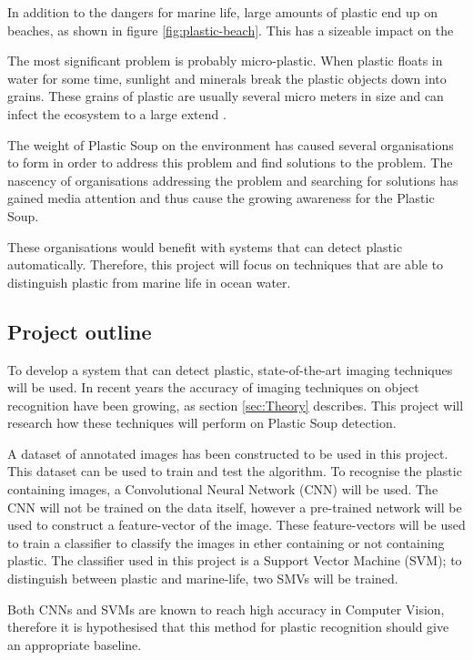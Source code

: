 In addition to the dangers for marine life, large amounts of plastic end up on beaches, as shown in figure \ref{fig:plastic-beach}.
This has a sizeable impact on the 

The most significant problem is probably micro-plastic.
When plastic floats in water for some time, sunlight and minerals break the plastic objects down into grains.
These grains of plastic are usually several micro meters in size and can infect the ecosystem to a large extend \citet{moore2011plastic}.

The weight of Plastic Soup on the environment has caused several organisations to form in order to address this problem and find solutions to the problem.
The nascency of organisations addressing the problem and searching for solutions has gained media attention and thus cause the growing awareness for the Plastic Soup.

These organisations would benefit with systems that can detect plastic automatically.
Therefore, this project will focus on techniques that are able to distinguish plastic from marine life in ocean water.

\subsection{Project outline}
\label{sec:Intro-Me}
To develop a system that can detect plastic, state-of-the-art imaging techniques will be used.
In recent years the accuracy of imaging techniques on object recognition have been growing, as section \ref{sec:Theory} describes.
This project will research how these techniques will perform on Plastic Soup detection.

A dataset of annotated images has been constructed to be used in this project.
This dataset can be used to train and test the algorithm.
To recognise the plastic containing images, a Convolutional Neural Network (CNN) will be used.
The CNN will not be trained on the data itself, however a pre-trained network will be used to construct a feature-vector of the image.
These feature-vectors will be used to train a classifier to classify the images in ether containing or not containing plastic.
The classifier used in this project is a Support Vector Machine (SVM); to distinguish between plastic and marine-life, two SMVs will be trained.

Both CNNs and SVMs are known to reach high accuracy in Computer Vision, therefore it is hypothesised that this method for plastic recognition should give an appropriate baseline.

